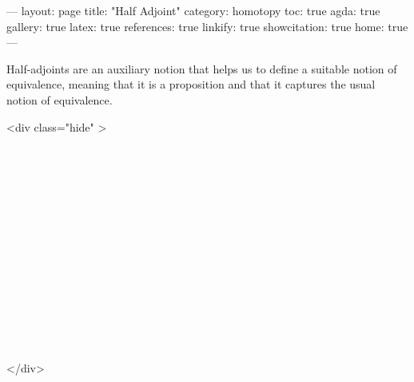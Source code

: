 ---
layout: page
title: "Half Adjoint"
category: homotopy
toc: true
agda: true
gallery: true
latex: true
references: true
linkify: true
showcitation: true
home: true
---

Half-adjoints are an auxiliary notion that helps us to define a suitable notion
of equivalence, meaning that it is a proposition and that it captures the usual
notion of equivalence.

<div class="hide" >
\begin{code}%
\>[0]\AgdaSymbol{\{-\#}\AgdaSpace{}%
\AgdaSpace{}%
\AgdaSpace{}%
\AgdaSymbol{\#-\}}\<%
\\
\>[0]\AgdaSpace{}%
\AgdaSpace{}%
\<%
\\
\>[0]\AgdaSpace{}%
\AgdaSpace{}%
\<%
\\
%
\\[\AgdaEmptyExtraSkip]%
\>[0]\AgdaSpace{}%
\AgdaSpace{}%
\<%
\\
\>[0]\AgdaSpace{}%
\AgdaSpace{}%
\<%
\\
%
\\[\AgdaEmptyExtraSkip]%
\>[0]\AgdaSpace{}%
\AgdaSpace{}%
\<%
\\
%
\\[\AgdaEmptyExtraSkip]%
\>[0]\AgdaSpace{}%
\AgdaSpace{}%
\<%
\\
\>[0]\AgdaSpace{}%
\AgdaSpace{}%
\<%
\\
%
\\[\AgdaEmptyExtraSkip]%
\>[0]\AgdaSpace{}%
\AgdaSpace{}%
\<%
\\
\>[0]\<%
\end{code}
</div>

